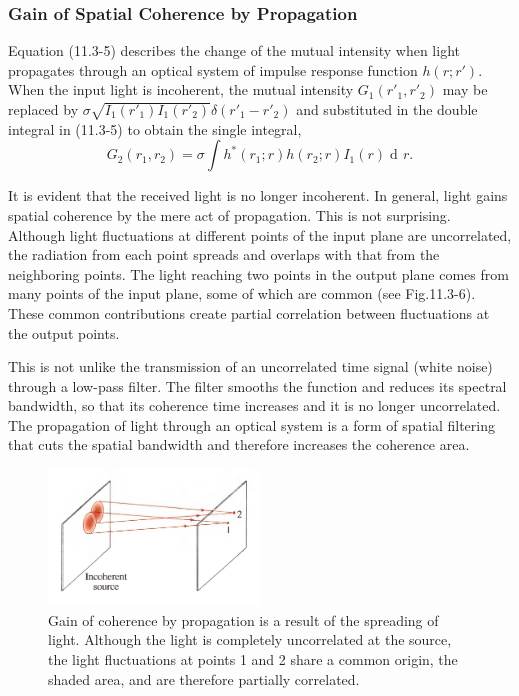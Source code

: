 \documentclass{article}
\numberwithin{figure}{subsection}
\numberwithin{table}{subsection}
\DeclareMathOperator\dif{d\!}
\begin{document}
\subsubsection{Gain of Spatial Coherence by Propagation}
\endgroup
Equation (11.3-5) describes the change of the mutual intensity when light propagates through an optical system of impulse response function $h(r; r')$. When the input light is incoherent, the mutual intensity $G_1 (r'_1, r'_2)$ may be replaced by $\sigma \sqrt{I_1 (r'_1) I_1 (r'_2)} \delta (r'_1 - r'_2)$ and substituted in the double integral in (11.3-5) to obtain the single integral,
\begin{equation}
G_2 (r_1, r_2) = \sigma \int h^\ast (r_1; r) h(r_2; r) I_1 (r) \dif r .
\end{equation}
\par It is evident that the received light is no longer incoherent. In general, light gains spatial coherence by the mere act of propagation. This is not surprising. Although light fluctuations at different points of the input plane are uncorrelated, the radiation from each point spreads and overlaps with that from the neighboring points. The light reaching two points in the output plane comes from many points of the input plane, some of which are common (see Fig.11.3-6). These common contributions create partial correlation between fluctuations at the output points.
\par This is not unlike the transmission of an uncorrelated time signal (white noise) through a low-pass filter. The filter smooths the function and reduces its spectral bandwidth, so that its coherence time increases and it is no longer uncorrelated. The propagation of light through an optical system is a form of spatial filtering that cuts the spatial bandwidth and therefore increases the coherence area.
\begin{figure}[H]
\centering
\includegraphics[width=0.5\textwidth]{11_3_6.PNG}
\caption{Gain of coherence by propagation is a result of the spreading of light. Although the light is completely uncorrelated at the source, the light fluctuations at points 1 and 2 share a common origin, the shaded area, and are therefore partially correlated.}
\label{fig: 11_3_6}
\end{figure}
\end{document}
